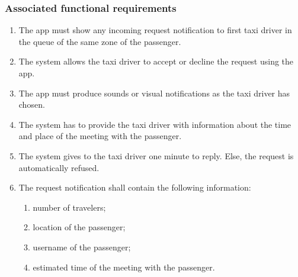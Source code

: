 \subsubsection{Associated functional requirements}
\begin{enumerate}
\item The app must show any incoming request notification to first taxi driver in the queue of the same zone of the passenger.
\item The system allows the taxi driver to accept or decline the request using the app.
\item The app must produce sounds or visual notifications as the taxi driver has chosen.
\item The system has to provide the taxi driver with information about the time and place of the meeting with the passenger.
\item The system gives to the taxi driver one minute to reply. Else, the request is automatically refused.
\item The request notification shall contain the following information:
\begin{enumerate}
	\item number of travelers;
	\item location of the passenger;
	\item username of the passenger;
	\item estimated time of the meeting with the passenger.
\end{enumerate}
\end{enumerate}

